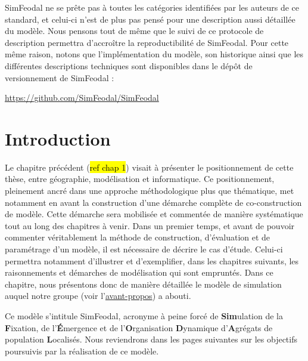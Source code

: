 \begin{mdframed}[backgroundcolor=black!5,footnoteinside=false]
SimFeodal ne se prête pas à toutes les catégories identifiées par les auteurs de ce standard, et celui-ci n'est de plus pas pensé pour une description aussi détaillée du modèle.
Nous pensons tout de même que le suivi de ce protocole de description permettra d'accroître la reproductibilité de SimFeodal.
Pour cette même raison, notons que l'implémentation du modèle, son historique ainsi que les différentes descriptions techniques sont disponibles dans le dépôt de versionnement de SimFeodal :
\begin{center}
	\href{https://github.com/SimFeodal/SimFeodal}{https://github.com/SimFeodal/SimFeodal}
\end{center}

\end{mdframed}

\clearpage

\clearpage


\section*{Introduction}
\label{sec:chap2-intro}

Le chapitre précédent (\hl{ref chap 1}) visait à présenter le positionnement de cette thèse, entre géographie, modélisation et informatique.
Ce positionnement, pleinement ancré dans une approche méthodologique plus que thématique, met notamment en avant la construction d'une démarche complète de co-construction de modèle.
Cette démarche sera mobilisée et commentée de manière systématique tout au long des chapitres à venir.
Dans un premier temps, et avant de pouvoir commenter véritablement la méthode de construction, d'évaluation et de paramétrage d'un modèle, il est nécessaire de décrire le cas d'étude.
Celui-ci permettra notamment d'illustrer et d'exemplifier, dans les chapitres suivants, les raisonnements et démarches de modélisation qui sont empruntés.
Dans ce chapitre, nous présentons donc de manière détaillée le modèle de simulation auquel notre groupe (voir l'\hyperlink{avant-propos}{avant-propos}) a abouti.

Ce modèle s'intitule SimFeodal, acronyme à peine forcé de \og \textbf{Sim}ulation de la \textbf{F}ixation, de l'\textbf{É}mergence et de l'\textbf{O}rganisation \textbf{D}ynamique d'\textbf{A}grégats de population \textbf{L}ocalisés\fg{}.
Nous reviendrons dans les pages suivantes sur les objectifs poursuivis par la réalisation de ce modèle.

